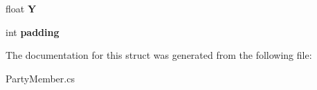 \begin{DoxyCompactItemize}
\item 
\hypertarget{structffxivlib_1_1_party_member_1_1_p_a_r_t_y_m_e_m_b_e_r_i_n_f_o_aa6de8771062f75d37ace78b480b2f981}{float {\bfseries Y}}\label{structffxivlib_1_1_party_member_1_1_p_a_r_t_y_m_e_m_b_e_r_i_n_f_o_aa6de8771062f75d37ace78b480b2f981}

\item 
\hypertarget{structffxivlib_1_1_party_member_1_1_p_a_r_t_y_m_e_m_b_e_r_i_n_f_o_a469840cdac04937ef2b9010b382d6f18}{int {\bfseries padding}}\label{structffxivlib_1_1_party_member_1_1_p_a_r_t_y_m_e_m_b_e_r_i_n_f_o_a469840cdac04937ef2b9010b382d6f18}

\end{DoxyCompactItemize}


The documentation for this struct was generated from the following file\-:\begin{DoxyCompactItemize}
\item 
Party\-Member.\-cs\end{DoxyCompactItemize}
